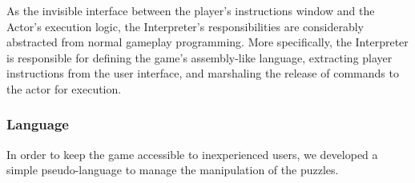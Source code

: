 As the invisible interface between the player's instructions window and the Actor's 
execution logic, the Interpreter's responsibilities are considerably abstracted from 
normal gameplay programming. More specifically, the Interpreter is responsible for 
defining the game's assembly-like language, extracting player instructions from the 
user interface, and marshaling the release of commands to the actor for execution.\\

\subsubsection{Language}
In order to keep the game accessible to inexperienced users, we developed a simple
pseudo-language to manage the manipulation of the puzzles.

